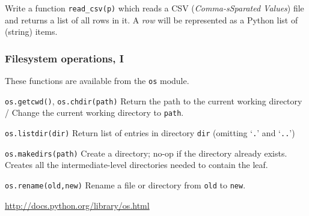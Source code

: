 \documentclass[english,serif,mathserif,xcolor=pdftex,dvipsnames,table]{beamer}
\begin{document}
\begin{frame}
  \begin{exercise*}[5.F]
    Write a function \lstinline|read_csv(p)| which reads a CSV
    (\emph{Comma-sSparated Values}) file and returns a list of all
    rows in it.  A \emph{row} will be represented as a Python list of
    (string) items.
  \end{exercise*}
\end{frame}


\begin{frame}[fragile]
  \frametitle{Filesystem operations, I}
  \small
  These functions are available from the \texttt{os} module.

  \begin{describe}{\lstinline|os.getcwd()|, \lstinline|os.chdir(path)|}
    Return the path to the current working directory /
    Change the current working directory to \texttt{path}.
  \end{describe}

  \begin{describe}{\lstinline|os.listdir(dir)|}
    Return list of entries in directory \texttt{dir} (omitting
    `\texttt{.}' and `\texttt{..}')
  \end{describe}


  \begin{describe}{\lstinline|os.makedirs(path)|}
    Create a directory; no-op if the directory already exists.
    Creates all the intermediate-level directories needed to contain
    the leaf.
  \end{describe}

  \begin{describe}{\lstinline|os.rename(old,new)|}
    Rename a file or directory from \texttt{old} to \texttt{new}.
  \end{describe}

  \begin{references}
    \url{http://docs.python.org/library/os.html}
  \end{references}
\end{frame}
\end{document}
